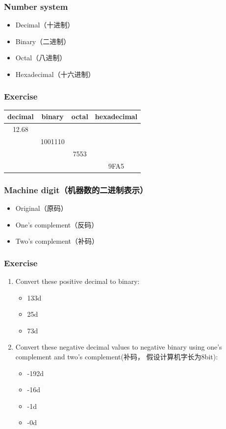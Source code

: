 \documentclass[red]{beamer}
\begin{document}
\begin{CJK*}{UTF8}{gbsn}
\begin{frame}
\frametitle{Number system}
\begin{itemize}
	\item Decimal（十进制）
	\item Binary（二进制）
	\item Octal（八进制）
	\item Hexadecimal（十六进制）
\end{itemize}
\end{frame}

\begin{frame}
\frametitle{Exercise}
\begin{table}[ht]
\begin{tabular}{|c|c|c|c|}
\hline
\textbf{decimal} & \textbf{binary} & \textbf{octal} & \textbf{hexadecimal}\\
\hline
12.68 & & & \\
\hline
& 1001110 & &\\
\hline
& & 7553 & \\
\hline
& & & 9FA5\\
\hline 
\end{tabular}
\end{table}
\end{frame}


\begin{frame}
\frametitle{Machine digit（机器数的二进制表示）}
\begin{itemize}
	\item Original（原码）
	\item One's complement（反码）
	\item Two's complement（补码）
\end{itemize}
\end{frame}

\begin{frame}
\frametitle{Exercise}
\begin{enumerate}
	\item Convert these positive decimal to binary:
	\begin{itemize}
		\item 133d
		\item 25d
		\item 73d
	\end{itemize}
	\item Convert these negative decimal values to negative 
		binary using one's complement and two's complement(补码，
		假设计算机字长为8bit):
	\begin{itemize}
		\item -192d
		\item -16d
		\item -1d
		\item -0d
	\end{itemize}
\end{enumerate}
\end{frame}




\end{CJK*}
\end{document}
